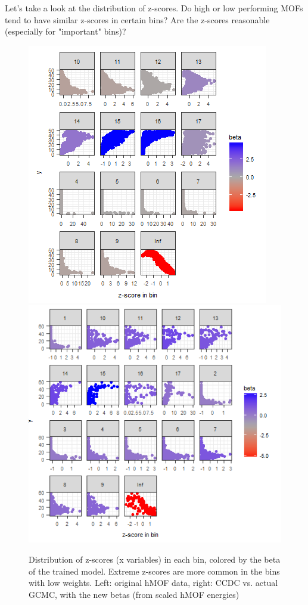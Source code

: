 \documentclass[letterpaper]{article}
\begin{document}
Let's take a look at the distribution of z-scores.  Do high or low performing MOFs tend to have similar z-scores in certain bins?  Are the z-scores reasonable (especially for "important" bins)?
\begin{figure}[H]
	\centering
	\includegraphics[width=0.47\columnwidth]{Figs/z_distr.png}
	\includegraphics[width=0.47\columnwidth]{Figs/z_distr_init_ccdc.png}
	\caption{Distribution of z-scores (x variables) in each bin, colored by the beta of the trained model.  Extreme z-scores are more common in the bins with low weights.  Left: original hMOF data, right: CCDC vs. actual GCMC, with the new betas (from scaled hMOF energies)}
	\label{fig:z_distr}
\end{figure}
\end{document}
